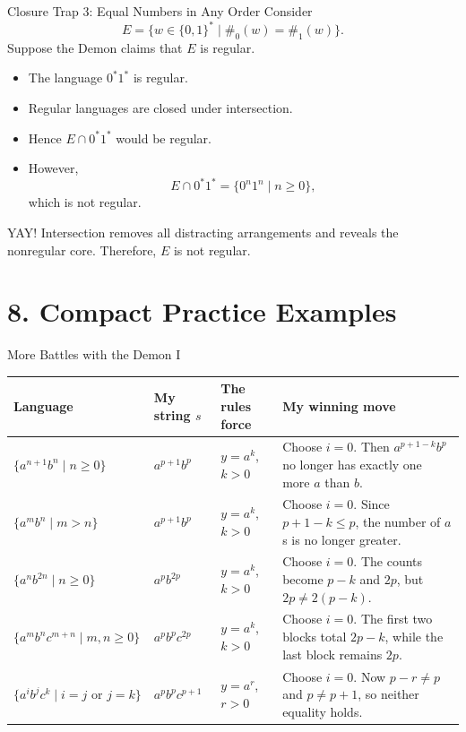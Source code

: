 \documentclass[10pt,aspectratio=169]{beamer}
\begin{document}
\begin{frame}{Closure Trap 3: Equal Numbers in Any Order}
\small
Consider
\[
E=\{w\in\{0,1\}^*\mid \#_0(w)=\#_1(w)\}.
\]
Suppose the Demon claims that $E$ is regular.

\begin{itemize}
    \item The language $0^*1^*$ is regular.
    \item Regular languages are closed under intersection.
    \item Hence $E\cap 0^*1^*$ would be regular.
    \item However,
    \[
    E\cap 0^*1^*
    =\{0^n1^n\mid n\geq 0\},
    \]
    which is not regular.
\end{itemize}

\begin{block}{YAY!}
Intersection removes all distracting arrangements and reveals the
nonregular core. Therefore, $E$ is not regular.
\end{block}
\end{frame}

\section{8. Compact Practice Examples}

\begin{frame}{More Battles with the Demon I}
\scriptsize
\renewcommand{\arraystretch}{1.34}
\setlength{\tabcolsep}{3pt}
\begin{center}
\begin{tabular}{p{3.0cm}p{2.4cm}p{2.3cm}p{5.3cm}}
\toprule
\textbf{Language} &
\textbf{My string $s$} &
\textbf{The rules force} &
\textbf{My winning move} \\
\midrule
$\{a^{n+1}b^n\mid n\geq 0\}$ &
$a^{p+1}b^p$ &
$y=a^k$, $k>0$ &
Choose $i=0$. Then $a^{p+1-k}b^p$ no longer has exactly one more $a$ than $b$. \\
\addlinespace
$\{a^mb^n\mid m>n\}$ &
$a^{p+1}b^p$ &
$y=a^k$, $k>0$ &
Choose $i=0$. Since $p+1-k\leq p$, the number of $a$s is no longer greater. \\
\addlinespace
$\{a^nb^{2n}\mid n\geq 0\}$ &
$a^pb^{2p}$ &
$y=a^k$, $k>0$ &
Choose $i=0$. The counts become $p-k$ and $2p$, but $2p\neq2(p-k)$. \\
\addlinespace
$\{a^mb^nc^{m+n}\mid m,n\geq 0\}$ &
$a^pb^pc^{2p}$ &
$y=a^k$, $k>0$ &
Choose $i=0$. The first two blocks total $2p-k$, while the last block remains $2p$. \\
\addlinespace
$\{a^ib^jc^k\mid i=j\text{ or }j=k\}$ &
$a^pb^pc^{p+1}$ &
$y=a^r$, $r>0$ &
Choose $i=0$. Now $p-r\neq p$ and $p\neq p+1$, so neither equality holds. \\
\bottomrule
\end{tabular}
\end{center}
\end{frame}
\end{document}
